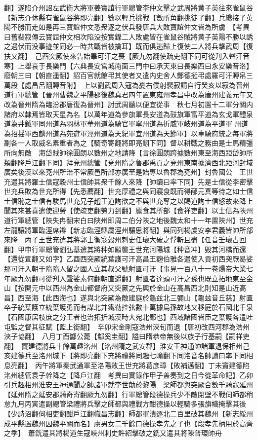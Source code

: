 翻】遂陷介州詔左武衛大將軍姜寶誼行軍總管李仲文擊之武周將黄子英往來雀鼠谷【新志介休縣有雀鼠谷將即亮翻】數以輕兵挑戰【數所角翻挑徒了翻】兵纔接子英陽不勝而走如是再三寶誼仲文悉衆逐之伏兵發唐兵大敗寶誼仲文皆為所虜　【考異曰舊裴寂傳云寶誼仲文相次陷没按實錄二人敗處皆在雀鼠谷賊將黄子英陽不勝以誘之遇伏而没事迹並同必一時共戰皆被擒耳】既而俱逃歸上復使二人將兵擊武周【復扶又翻】　己酉突厥使來告始畢可汗之喪【厥九勿翻使疏吏翻下同可從刋入聲汗音寒】上舉哀于長樂門【六典長安宫城南面三門中曰承天東曰長樂西曰永安樂音洛】廢朝三曰【朝直遥翻】詔百官就館弔其使者又遣内史舍人鄭德挺弔處羅可汗賻帛三萬段【處昌呂翻賻音附】　上以劉武周入寇為憂右僕射裴寂請自行癸亥以寂為晉州道行軍總管【晉州曹魏之平陽郡後魏真君四年置東雍州孝昌中改為唐州建義元年又改為晉州隋為臨汾郡唐復為晉州】討武周聽以便宜從事　秋七月初置十二軍分關内諸府以隸焉皆取天星為名【以萬年道為參旗軍長安道為鼓旗軍富平道為玄戈軍醴泉道為井鉞軍同州道為羽林軍華州道為騎官軍寧州道為折威軍岐州道為平道軍州道為招揺軍西麟州道為苑遊軍涇州道為天紀軍宜州道為天節軍】以車騎府統之每軍將副各一人取威名素重者為之【騎奇寄翻將即亮翻下同】督以耕戰之務由是士馬精彊所向無敵　海岱賊帥徐圓朗以數州之地請降【言徐圓朗跨據數州東至海西距岱帥所類翻降戶江翻下同】拜兗州總管【兗州隋之魯郡禹貢之兗州東南據濟西北距河封域廣矣後漢以來兗州所治不常厥邑所部亦廣至是始專以魯郡為兗州】封魯國公　王世充遣其將羅士信寇穀州士信帥其衆千餘人來降【帥讀曰率下同】先是士信從李密擊世充兵敗為世充所得【先悉薦翻】世充厚禮之與同寢食既而得邴元真等待之如士信士信恥之士信有駿馬世充兄子趙王道詢欲之不與世充奪之以賜道詢士信怒故來降上聞其來甚喜遣使迎勞【使疏吏翻勞力到翻】廪食其所部【食祥吏翻】以士信為陜州道行軍總管【陜失冉翻宋白曰陜州即周二伯分陜之地後魏太和十一年置陜州】世充左龍驤將軍臨涇席辯【新志臨涇縣屬涇州驤思將翻】與同列楊䖍安李君義皆帥所部來降　丙子王世充遣其將郭士衡寇穀州刺史任瓌大破之俘斬且盡【任音壬瓌古回翻】甲申行軍總管劉弘基遣其將种如願襲王世充河陽城【种音冲】毁其河橋而還【還從宣翻又如字】乙酉西突厥統葉護可汗高昌王麴伯雅各遣使入貢初西突厥曷娑那可汗入朝于隋隋人留之國人立其叔父號射匱可汗【事見一百八十一卷煬帝大業七年厥九勿翻可從刋入聲娑素何翻朝直遥翻】射匱者達頭可汗之孫也既立拓地東至金山【按開元中以西州為金山都督府又突厥之先興於金山在高昌西北則知是山近高昌】西至海【此西海也】遂與北突厥為敵建庭於龜兹北三彌山【龜兹音丘慈】射匱卒子統葉護立統葉護勇而有謀北并鐵勒控弦數十萬據烏孫故地又移庭於石國北千泉【石國康居枝庶之分王者也治拓折城漢時大宛北鄙也】西域諸國皆臣之葉護各遣吐屯監之督其征賦【監上銜翻】　辛卯宋金剛寇浩州浹旬而退【唐初改西河郡為浩州浹子協翻】　八月丁酉酅公薨【酅奚圭翻】謚曰隋恭帝無後以族子行基嗣【嗣祥吏翻】　竇建德將兵十餘萬趣洺州【洺州隋之武安郡】淮安王神通帥諸軍退保相州己亥建德兵至洺州城下【將即亮翻下充將禮將同趣七喻翻下同洺音名帥讀曰率下同相息亮翻】　丙午將軍秦武通軍至洛陽敗王世充將葛彦璋【敗補邁翻】丁未竇建德陷洺州總管袁子幹降之【降戶江翻　考異曰實錄作甲子盖奏到之日今從革命記】乙卯引兵趣相州淮安王神通聞之帥諸軍就李世勣於黎陽　梁師都與突厥合數千騎寇延州【延州隋之延安郡騎奇寄翻厥九勿翻】行軍總管段德操兵少不敵閉壁不戰伺師都稍怠九月丙寅遣副總管梁禮將兵擊之師都與禮戰方酣德操以輕騎多張旗幟掩擊其後【少詩沼翻伺相吏翻酣戶江翻幟昌志翻】師都軍潰逐北二百里破其魏州【新志綏州成平縣置魏州因魏平關而名】虜男女二千餘口德操孝先之子也【段孝先柄用於高齊之季】　蕭銑遣其將楊道生寇峽州刺史許紹擊破之銑又遣其將陳普環帥舟